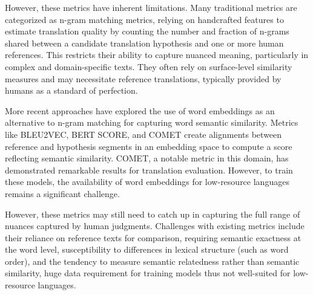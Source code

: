 \documentclass[runningheads]{llncs}
\begin{document}
However, these metrics have inherent limitations. Many traditional metrics are categorized as n-gram matching metrics, relying on handcrafted features to estimate translation quality by counting the number and fraction of n-grams shared between a candidate translation hypothesis and one or more human references. This restricts their ability to capture nuanced meaning, particularly in complex and domain-specific texts. They often rely on surface-level similarity measures and may necessitate reference translations, typically provided by humans as a standard of perfection. 

More recent approaches have explored the use of word embeddings as an alternative to n-gram matching for capturing word semantic similarity. Metrics like BLEU2VEC\cite{bleu2vec}, BERT SCORE\cite{bertscore}, and COMET\cite{comet} create alignments between reference and hypothesis segments in an embedding space to compute a score reflecting semantic similarity. COMET, a notable metric in this domain, has demonstrated remarkable results for translation evaluation. However, to train these models, the availability of word embeddings for low-resource languages remains a significant challenge. 

However, these metrics may still need to catch up in capturing the full range of nuances captured by human judgments. 
Challenges with existing metrics include their reliance on reference texts for comparison, requiring semantic exactness at the word level, susceptibility to differences in lexical structure (such as word order), and the tendency to measure semantic relatedness rather than semantic similarity, huge data requirement for training models thus not well-suited for low-resource languages.





\end{document}
